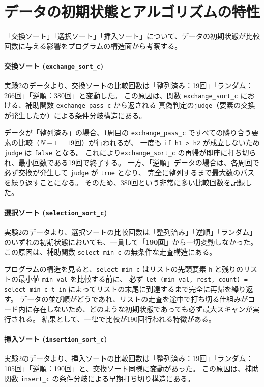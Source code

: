 \documentclass[titlepage]{ltjsarticle}
\begin{document}
\clearpage

\section{データの初期状態とアルゴリズムの特性}
「交換ソート」「選択ソート」「挿入ソート」について、データの初期状態が比較回数に与える影響をプログラムの構造面から考察する。

\paragraph{交換ソート (\texttt{exchange\_sort\_c})}
\par
実験2のデータより、交換ソートの比較回数は「整列済み：19回」「ランダム：266回」「逆順：380回」と変動した。
この原因は、関数 \texttt{exchange\_sort\_c} における、補助関数 \texttt{exchange\_pass\_c} から返される
真偽判定の\texttt{judge}（要素の交換が発生したか）による条件分岐構造にある。

データが「整列済み」の場合、1周目の \texttt{exchange\_pass\_c} ですべての隣り合う要素の比較（$N-1 = 19$回）が行われるが、
一度も \texttt{if h1 > h2} が成立しないため \texttt{judge} は \texttt{false} となる。
これにより\texttt{exchange\_sort\_c} の再帰が即座に打ち切られ、最小回数である19回で終了する。
一方、「逆順」データの場合は、各周回で必ず交換が発生して \texttt{judge} が \texttt{true} となり、
完全に整列するまで最大数のパスを繰り返すことになる。
そのため、380回という非常に多い比較回数を記録した。

\paragraph{選択ソート (\texttt{selection\_sort\_c})}
\par
実験2のデータより、選択ソートの比較回数は「整列済み」「逆順」「ランダム」のいずれの初期状態においても、一貫して\textbf{「190回」}から一切変動しなかった。
この原因は、補助関数 \texttt{select\_min\_c} の無条件な走査構造にある。

プログラムの構造を見ると、\texttt{select\_min\_c} はリストの先頭要素 \texttt{h} と残りのリストの最小値 \texttt{min\_val} を比較する前に、
必ず \texttt{let (min\_val, rest, count) = select\_min\_c t in} によってリストの末尾に到達するまで完全に再帰を繰り返す。
データの並び順がどうであれ、リストの走査を途中で打ち切る仕組みがコード内に存在しないため、どのような初期状態であっても必ず最大スキャンが実行される。
結果として、一律で比較が190回行われる特徴がある。

\paragraph{挿入ソート (\texttt{insertion\_sort\_c})}
\par
実験2のデータより、挿入ソートの比較回数は「整列済み：19回」「ランダム：105回」「逆順：190回」と、交換ソート同様に変動があった。
この原因は、補助関数 \texttt{insert\_c} の条件分岐による早期打ち切り構造にある。
\end{document}
